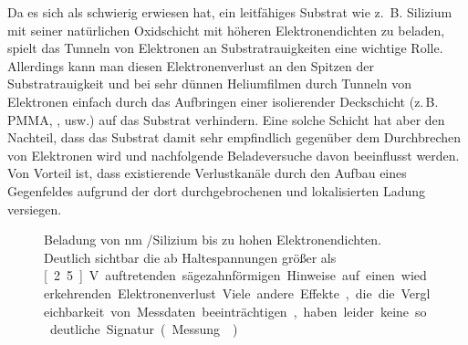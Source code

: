 Da es sich als schwierig erwiesen hat, ein leitfähiges Substrat wie z.\ B. Silizium mit seiner natürlichen Oxidschicht mit höheren Elektronendichten zu beladen, spielt das Tunneln von Elektronen an Substratrauigkeiten eine wichtige Rolle. Allerdings kann man diesen Elektronenverlust an den Spitzen der Substratrauigkeit und bei sehr dünnen Heliumfilmen durch Tunneln von Elektronen einfach durch das Aufbringen einer isolierender Deckschicht (z.\,B. PMMA, \SiO, usw.) auf das Substrat verhindern. Eine solche Schicht hat aber den Nachteil, dass das Substrat damit sehr empfindlich gegenüber dem Durchbrechen von Elektronen wird und nachfolgende Beladeversuche davon beeinflusst werden. Von Vorteil ist, dass existierende Verlustkanäle durch den Aufbau eines Gegenfeldes aufgrund der dort durchgebrochenen und lokalisierten Ladung versiegen.

\begin{figure}[h!tb]
    \hfill%
    \begin{minipage}[b]{\textwidth-\midwidth-\tabcolsep}
        \caption[hohe Elektronendichten auf \SiO\ mit sichtbarem Elektronenverlust]{Beladung von \unit[200]{nm} \SiO /Silizium bis zu hohen Elektronendichten. Deutlich sichtbar die ab Haltespannungen größer als \unit[2.5]{V} auftretenden sägezahnförmigen Hinweise auf einen wiederkehrenden Elektronenverlust. Viele andere Effekte, die die Vergleichbarkeit von Messdaten beeinträchtigen, haben leider keine so deutliche Signatur. (Messung )}
        \label{fig:e_sawtooth}
    \end{minipage}
\end{figure}

